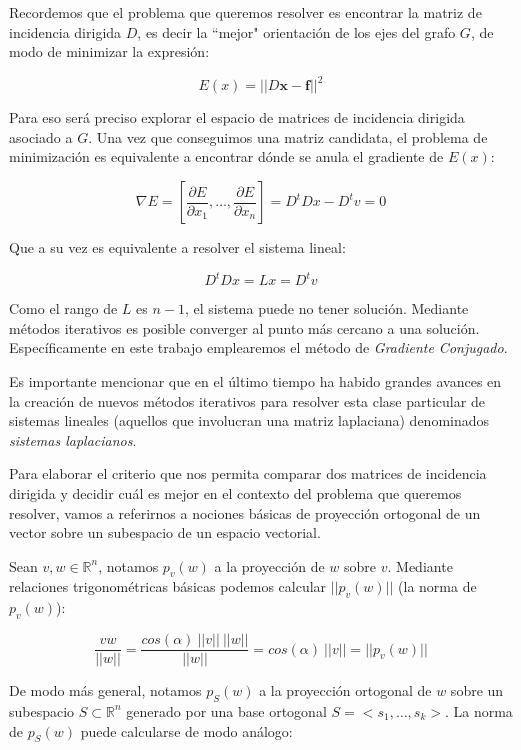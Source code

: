 \documentclass[10pt, a4paper, twocolumn]{article} %
\begin{document}
\bigskip


Recordemos que el problema que queremos resolver es encontrar la matriz 
de incidencia dirigida $D$, es decir la ``mejor" orientación de los ejes 
del grafo $G$, de modo de minimizar la expresión:

$$E(x) = ||D\bm{x}-\bm{f}||^2$$

Para eso será preciso explorar el espacio de matrices de 
incidencia dirigida asociado a $G$. Una vez que conseguimos una 
matriz candidata, el problema de minimización es equivalente a encontrar
dónde se anula el gradiente de $E(x)$:
 
$$\nabla E = [\frac{\partial E}{\partial x_1}, \dots, \frac{\partial 
E}{\partial x_n}] = D^tDx-D^tv=0$$

Que a su vez es equivalente a resolver el sistema lineal:

$$D^tDx = Lx = D^tv$$

Como el rango de $L$ es $n-1$, el sistema puede no tener solución. 
Mediante métodos iterativos es posible converger al punto más cercano a 
una solución. Específicamente en este trabajo emplearemos el método de 
\textit{Gradiente Conjugado}.

\smallskip

Es importante mencionar que en el último 
tiempo ha habido grandes avances en la creación de nuevos métodos 
iterativos para resolver esta clase particular de sistemas lineales 
(aquellos que involucran una matriz laplaciana) denominados 
\textit{sistemas laplacianos}.

\bigskip


Para elaborar el criterio que nos permita comparar dos matrices de 
incidencia dirigida y decidir cuál es mejor en el contexto del problema 
que queremos resolver, vamos a referirnos a nociones básicas de 
proyección ortogonal de un vector sobre un subespacio de un espacio 
vectorial.

\smallskip

Sean $v,w \in \mathbb{R}^n$, notamos $p_v(w)$ a la proyección de $w$ 
sobre $v$. Mediante relaciones trigonométricas básicas podemos 
calcular $||p_v(w)||$ (la norma de $p_v(w)$):

$$\frac{v w}{||w||} = \frac{cos(\alpha) \ ||v|| \ ||w||}{||w||} = 
cos(\alpha) \ ||v|| = ||p_v(w)||$$

De modo más general, notamos $p_S(w)$ a la proyección ortogonal de $w$
sobre un subespacio $S \subset \mathbb{R}^n$ generado por una base 
ortogonal $S = <s_1, \dots, s_k>$. La norma de $p_S(w)$ puede calcularse
de modo análogo:
\end{document}
